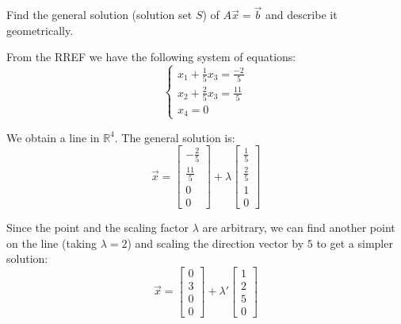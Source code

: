 \documentclass[a4paper,11pt]{exam}
\begin{document}
\begin{questions}
\begin{parts}
\begin{subparts}
            \subpart Find the general solution (solution set $S$) of $A \vec{x}=\vec{b}$ and describe it geometrically.

            \begin{solution}
                From the RREF we have the following system of equations:
                \[
                    \begin{cases}
                        x_1+\frac{1}{5} x_3=\frac{-2}{5} \\
                        x_2+\frac{2}{5} x_3=\frac{11}{5} \\
                        x_4=0
                    \end{cases}
                \]

                We obtain a line in $\mathbb{R}^4$. The general solution is:
                \[
                    \vec{x}=\left[\begin{array}{c}
                            -\frac{2}{5} \\[6pt]
                            \frac{11}{5} \\[6pt]
                            0            \\[6pt]
                            0
                        \end{array}\right]+\lambda\left[\begin{array}{c}
                            \frac{1}{5} \\[6pt]
                            \frac{2}{5} \\[6pt]
                            1           \\[6pt]
                            0
                        \end{array}\right]
                \]

                Since the point and the scaling factor $\lambda$ are arbitrary,
                we can find another point on the line (taking $\lambda = 2$)
                and scaling the direction vector by $5$ to get a simpler solution:
                \[
                    \vec{x}=\left[\begin{array}{c}
                            0 \\
                            3 \\
                            0 \\
                            0
                        \end{array}\right]+\lambda'\left[\begin{array}{c}
                            1 \\
                            2 \\
                            5 \\
                            0
                        \end{array}\right]
                \]


\end{solution}
\end{subparts}
\end{parts}
\end{questions}
\end{document}
